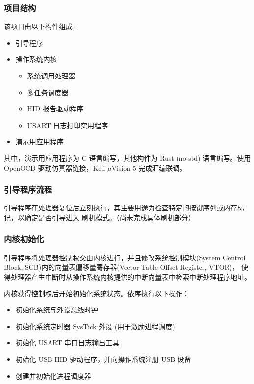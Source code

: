 \documentclass[aspectratio=169]{ctexbeamer}
\begin{document}
\begin{frame}
    \frametitle{项目结构}
    
    该项目由以下构件组成：

    \begin{itemize}
        \item 引导程序
        \item 操作系统内核
        \begin{itemize}
            \item 系统调用处理器
            \item 多任务调度器
            \item HID 报告驱动程序
            \item USART 日志打印实用程序
        \end{itemize}
        \item 演示用应用程序
    \end{itemize}

    其中，演示用应用程序为 C 语言编写，其他构件为 Rust (no-std) 语言编写。使用 OpenOCD
    驱动仿真器链接，Keli \(\mu\)Vision 5 完成汇编联调。
\end{frame}

\begin{frame}
    \frametitle{引导程序流程}

    引导程序在处理器复位后立刻执行，其主要用途为检查特定的按键序列或内存标记，以确定是否引导进入
    刷机模式。（尚未完成具体刷机部分）
    
    \vspace{1em}

\end{frame}

\begin{frame}
    \frametitle{内核初始化}

    引导程序将处理器控制权交由内核进行，并且修改系统控制模块(System Control Block, SCB)内的向量表偏移量寄存器(Vector Table Offset Register, VTOR)，
    使得处理器产生中断时从操作系统内核提供的中断向量表中检索中断处理程序地址。
    \par
    内核获得控制权后开始初始化系统状态。依序执行以下操作：
    \begin{itemize}
        \item 初始化系统与外设总线时钟
        \item 初始化系统定时器 SysTick 外设 (用于激励进程调度)
        \item 初始化 USART 串口日志输出工具
        \item 初始化 USB HID 驱动程序，并向操作系统注册 USB 设备
        \item 创建并初始化进程调度器
    \end{itemize}
\end{frame}
\end{document}
